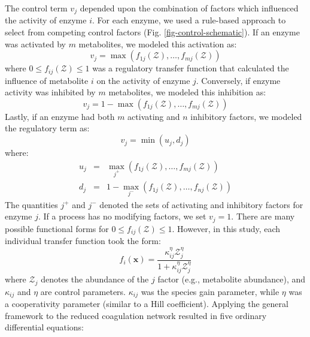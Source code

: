 \documentclass[12pt]{article}
\begin{document}
The control term $v_{j}$ depended upon the combination of factors which influenced the activity of enzyme $i$.
For each enzyme, we used a rule-based approach to select from competing control factors (Fig. \ref{fig-control-schematic}). 
If an enzyme was activated by $m$ metabolites, we modeled this activation as:
\begin{equation}
	v_{j} = \max\left(f_{1j}\left(\mathcal{Z}\right),\hdots,f_{mj}\left(\mathcal{Z}\right)\right)
\end{equation}where $0\leq f_{ij}\left(\mathcal{Z}\right)\leq 1$ was a regulatory transfer function that calculated the influence of metabolite $i$ on the activity of enzyme $j$. 
Conversely, if enzyme activity was inhibited by $m$ metabolites, we modeled this inhibition as:
\begin{equation}
	v_{j} = 1 - \max\left(f_{1j}\left(\mathcal{Z}\right),\hdots,f_{mj}\left(\mathcal{Z}\right)\right)
\end{equation}Lastly, if an enzyme had both $m$ activating and $n$ inhibitory factors, we modeled the regulatory term as:
\begin{equation}
	v_{j} = \min\left(u_{j},d_{j}\right)
\end{equation}where:
\begin{eqnarray}
	u_{j} &=& \max_{j^{+}}\left(f_{1j}\left(\mathcal{Z}\right),\hdots,f_{mj}\left(\mathcal{Z}\right)\right) \\
	d_{j} &=& 1 - \max_{j^{-}}\left(f_{1j}\left(\mathcal{Z}\right),\hdots,f_{nj}\left(\mathcal{Z}\right)\right)
\end{eqnarray}
The quantities $j^{+}$ and $j^{-}$ denoted the sets of activating and inhibitory factors for enzyme $j$. 
If a process has no modifying factors, we set $v_{j} = 1$.
There are many possible functional forms for $0\leq f_{ij}\left(\mathcal{Z}\right)\leq 1$. 
However, in this study, each individual transfer function took the form:
\begin{equation}\label{eqn:control-factor}
	f_{i}\left(\mathbf{x}\right) = \frac{\kappa_{ij}^{\eta}\mathcal{Z}_{j}^{\eta}}{1 + \kappa_{ij}^{\eta}\mathcal{Z}_{j}^{\eta}}
\end{equation}where $\mathcal{Z}_{j}$ denotes the abundance of the $j$ factor (e.g., metabolite abundance), and $\kappa_{ij}$ and $\eta$ are control parameters. 
$\kappa_{ij}$ was the species gain parameter, while $\eta$ was a cooperativity parameter (similar to a Hill coefficient).
Applying the general framework to the reduced coagulation network resulted in five ordinary differential equations:
\end{document}
